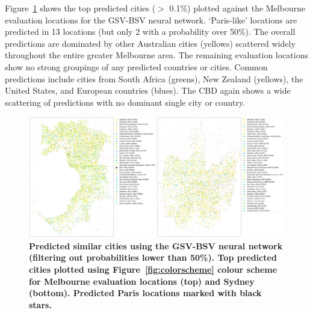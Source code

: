 \documentclass[Crown,sageh,times]{sagej}
\begin{document}
Figure~\ref{fig:melstreet} shows the top predicted cities ($>$ 0.1\%) plotted against the Melbourne evaluation locations for the GSV-BSV neural network. `Paris-like' locations are predicted in 13 locations (but only 2 with a probability over 50\%). The overall predictions are dominated by other Australian cities (yellows) scattered widely throughout the entire greater Melbourne area. The remaining evaluation locations show no strong groupings of any predicted countries or cities. Common predictions include cities from South Africa (greens), New Zealand (yellows), the United States, and European countries (blues). The CBD again shows a wide scattering of predictions with no dominant single city or country.





\begin{figure}[!htbp]
\centering   
\includegraphics[scale=0.10]{Images/Figure6GSV.png} 
\caption{ \bf Predicted similar cities using the GSV-BSV neural network (filtering out probabilities lower than 50\%). Top predicted cities plotted using Figure~\ref{fig:colorscheme} colour scheme for Melbourne evaluation locations (top) and Sydney (bottom). Predicted Paris locations marked with black stars.}    
 \label{fig:melstreet}  
\end{figure} 
\end{document}
